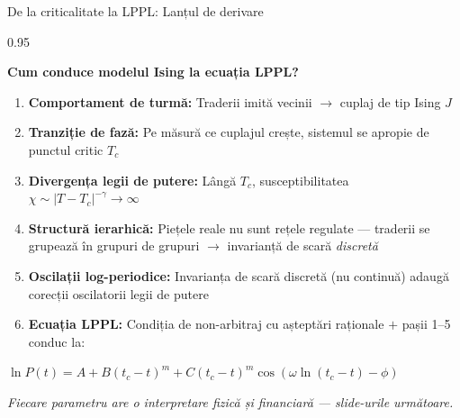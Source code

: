 \documentclass[9pt, aspectratio=169, t]{beamer}
\begin{document}
\begin{frame}{De la criticalitate la LPPL: Lanțul de derivare}
    \begin{cminipage}{0.95\textwidth}
    {\footnotesize
    \begin{center}
        \textcolor{MainBlue}{\textbf{Cum conduce modelul Ising la ecuația LPPL?}}
    \end{center}
    \vspace{2mm}
    \begin{enumerate}\setlength{\itemsep}{4pt}
        \item[\textcolor{MainBlue}{\textbf{1}}] \textbf{Comportament de turmă:} Traderii imită vecinii $\to$ cuplaj de tip Ising $J$
        \item[\textcolor{MainBlue}{\textbf{2}}] \textbf{Tranziție de fază:} Pe măsură ce cuplajul crește, sistemul se apropie de punctul critic $T_c$
        \item[\textcolor{MainBlue}{\textbf{3}}] \textbf{Divergența legii de putere:} Lângă $T_c$, susceptibilitatea $\chi \sim |T - T_c|^{-\gamma} \to \infty$
        \item[\textcolor{MainBlue}{\textbf{4}}] \textbf{Structură ierarhică:} Piețele reale nu sunt rețele regulate --- traderii se grupează în grupuri de grupuri $\to$ invarianță de scară \textit{discretă}
        \item[\textcolor{Crimson}{\textbf{5}}] \textbf{Oscilații log-periodice:} Invarianța de scară discretă (nu continuă) adaugă corecții oscilatorii legii de putere
        \item[\textcolor{Crimson}{\textbf{6}}] \textbf{Ecuația LPPL:} Condiția de non-arbitraj cu așteptări raționale $+$ pașii 1--5 conduc la:
    \end{enumerate}
    \vspace{2mm}
    \begin{center}
        $\boxed{\ln P(t) = A + B(t_c - t)^m + C(t_c - t)^m \cos(\omega \ln(t_c - t) - \phi)}$
    \end{center}
    \vspace{1mm}
    \begin{center}
        \textcolor{MediumGray}{\textit{Fiecare parametru are o interpretare fizică și financiară --- slide-urile următoare.}}
    \end{center}
    }
    \end{cminipage}
\end{frame}

\end{document}
